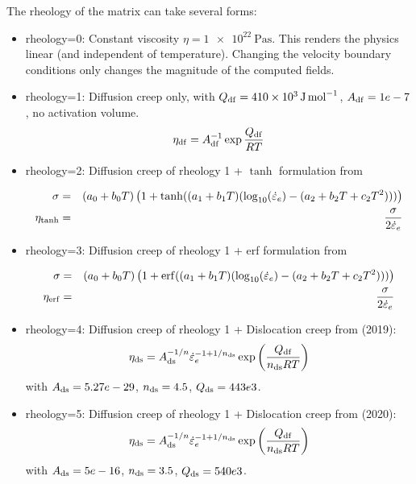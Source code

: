 The rheology of the matrix can take several forms:
\begin{itemize}

\item {\python rheology=0}: Constant viscosity $\eta=\SI{1e22}{\pascal\second}$. This renders
the physics linear (and independent of temperature). Changing the velocity boundary conditions
only changes the magnitude of the computed fields.

\item {\python rheology=1}: Diffusion creep only, with $Q_{\rm df}=\SI{410e3}{\joule\per\mole}$, 
$A_{\rm df}=1e-7$, no activation volume.
\[
\eta_{\rm df}=A_{\rm df}^{-1}\exp \frac{Q_{\rm df}}{RT}
\]

\item {\python rheology=2}: Diffusion creep of rheology 1 + $\tanh$ formulation from \textcite{gatt20} 

\begin{eqnarray}
\sigma &=& (a_0+b_0T) \left( 1+ \tanh( (a_1+b_1T)(\log_{10}(\dot\varepsilon_e)-(a_2+b_2T+c_2T^2)) )\right)\nonumber\\
\eta_{\rm tanh}&=&\frac{\sigma}{2 \dot{\varepsilon}_e} \nonumber
\end{eqnarray}

\item {\python rheology=3}: Diffusion creep of rheology 1 + erf formulation from \textcite{gatt20} 


\begin{eqnarray}
\sigma &=&(a_0+b_0T) \left( 1+ {\rm erf}( (a_1+b_1T)(\log_{10}(\dot\varepsilon_e)- (a_2+b_2T+c_2T^2)) )  
\right) \nonumber\\
\eta_{\rm erf}&=&\frac{\sigma}{2 \dot{\varepsilon}_e} \nonumber
\end{eqnarray}


\item {\python rheology=4}: Diffusion creep of rheology 1 + Dislocation creep from \textcite{gocg19} (2019):
\[
\eta_{\rm ds} = A_{\rm ds}^{-1/n} \dot\varepsilon_e^{-1+1/n_{\rm ds}}
\exp\left( \frac{Q_{\rm df}}{n_{\rm ds}RT} \right)
\]
with $A_{\rm ds}=5.27e-29$, $n_{\rm ds}=4.5$, $Q_{\rm ds}=443e3$.

\item {\python rheology=5}: Diffusion creep of rheology 1 + Dislocation creep from \textcite{gatt20} (2020):
\[
\eta_{\rm ds} = A_{\rm ds}^{-1/n} \dot\varepsilon_e^{-1+1/n_{\rm ds}}
\exp\left( \frac{Q_{\rm df}}{n_{\rm ds}RT}\right)
\]
with $A_{\rm ds}=5e-16$, $n_{\rm ds}=3.5$, $Q_{\rm ds}=540e3$.


\end{itemize}


